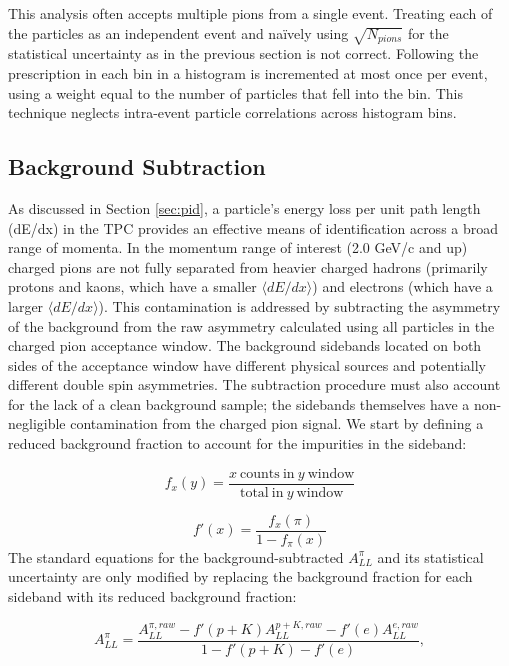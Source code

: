 This analysis often accepts multiple pions from a single event. Treating each
of the particles as an independent event and na\"ively using
$\sqrt{N_{pions}}$ for the statistical uncertainty as in the previous section
is not correct. Following the prescription in
\cite{sowinski-multiparticle-statistics} each bin in a histogram is
incremented at most once per event, using a weight equal to the number of
particles that fell into the bin. This technique neglects intra-event particle
correlations across histogram bins.

\subsection{Background Subtraction}

As discussed in Section \ref{sec:pid}, a particle's energy loss per unit path
length (dE/dx) in the TPC provides an effective means of identification across
a broad range of momenta. In the momentum range of interest (2.0 GeV/c and up)
charged pions are not fully separated from heavier charged hadrons (primarily protons and kaons, which have a smaller \(\langle dE/dx \rangle\)) and
electrons (which have a larger \(\langle dE/dx \rangle\)). This contamination is addressed by subtracting the asymmetry of
the background from the raw asymmetry calculated using all
particles in the charged pion acceptance window. The background sidebands located on both sides of the acceptance window have different physical sources and potentially different double spin asymmetries.  The subtraction
procedure must also account for the lack of a clean background sample; the
sidebands themselves have a non-negligible contamination from the charged pion
signal. We start by defining a reduced background fraction to account for the
impurities in the sideband:

\begin{equation*}
  f_{x}(y) = \frac{x~\mathrm{counts~in}~y~\mathrm{window}}{\mathrm{total~ in}~y~\mathrm{window}}
\end{equation*}

\begin{equation*}
  f'(x) = \frac{f_{x}(\pi)}{1 - f_{\pi}(x)}
\end{equation*}
%
The standard equations for the background-subtracted $A_{LL}^{\pi}$ and its
statistical uncertainty are only modified by replacing the background fraction
for each sideband with its reduced background fraction:

\begin{equation}
  A_{LL}^{\pi} = \frac{ A_{LL}^{\pi,raw} - f'(p+K)A_{LL}^{p+K,raw} - f'(e)A_{LL}^{e,raw} }{1 - f'(p+K) - f'(e)},
  \label{eqn:all}
\end{equation}

